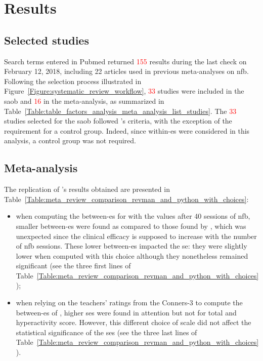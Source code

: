 

\section{Results}

\subsection{Selected studies}

Search terms entered in Pubmed returned \textcolor{red}{155} results during the last check on February 12, 2018, including 22 
articles used in previous meta-analyses on \gls{nfb}. Following the selection process illustrated 
in Figure~\ref{Figure:systematic_review_workflow}, \textcolor{red}{33} studies were included in the \gls{saob} and \textcolor{red}{16} in the meta-analysis, 
as summarized in Table~\ref{Table:table_factors_analysis_meta_analysis_list_studies}. The \textcolor{red}{33} studies selected for the \gls{saob} 
followed \citeauthor{Cortese2016}'s criteria, with the exception of the requirement for a control group. 
Indeed, since within-\gls{es} were considered in this analysis, a control group was not required.

\subsection{Meta-analysis}

The replication of \citeauthor{Cortese2016}'s results obtained are presented 
in Table~\ref{Table:meta_review_comparison_revman_and_python_with_choices}:

\begin{itemize}
    \item when computing the between-\gls{es} for \citet{Arnold2014} with the values after 40 sessions of \gls{nfb}, 
      smaller between-\gls{es} were found as compared to those found by \citet{Cortese2016}, which was unexpected since  
			the clinical efficacy is supposed to increase with the number of \gls{nfb} sessions. These lower between-\gls{es}
			impacted the \gls{se}: they were slightly lower when computed with this choice although they nonetheless remained significant (see the three first lines 
			of Table~\ref{Table:meta_review_comparison_revman_and_python_with_choices});  
    \item when relying on the teachers' ratings from the Conners-3 to compute the between-\gls{es} of \citet{Steiner2014}, 
		higher \glspl{se} were found in attention but not for total and hyperactivity score. However, this different choice of 
		scale did not affect the statistical significance of the \glspl{se} (see the three last lines 
			of Table~\ref{Table:meta_review_comparison_revman_and_python_with_choices}).
\end{itemize}

